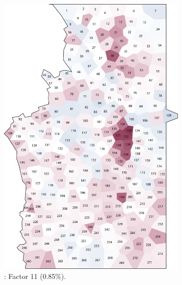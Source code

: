 \documentclass[output=paper]{LSP/langsci}
\begin{document}
\begin{figure}
\begin{subfigure}[t]{0.3\textwidth}
\includegraphics[width=\textwidth]{illustrations/pickl_fig10}
\caption{: Factor 11 (0.85\%).}
\label{fig:pickl:10}
\end{subfigure}  
~
\begin{subfigure}[t]{0.3\textwidth}

\end{subfigure}
\end{figure}
\end{document}
